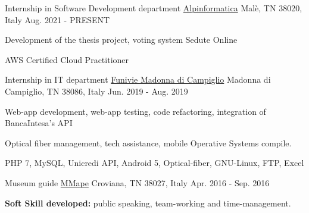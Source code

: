 

\begin{cventries}
  \cventry
    {Internship in Software Development department} %
    {\href{https://www.alpinformatica.com/}{Alpinformatica}} %
    {Malè, TN 38020, Italy} %
    {Aug. 2021 - PRESENT} %
    {
      \begin{cvitems} %
        \item {Development of the thesis project, voting system Sedute Online}
        \item {AWS Certified Cloud Practitioner}
      \end{cvitems}
      }
  \cventry
    {Internship in IT department} %
    {\href{https://www.funiviecampiglio.it}{Funivie Madonna di Campiglio}} %
    {Madonna di Campiglio, TN 38086, Italy} %
    {Jun. 2019 - Aug. 2019} %
    {
      \begin{cvitems} %
        \item {Web-app development, web-app testing, code refactoring, integration of BancaIntesa's API}
        \item {Optical fiber management, tech assistance, mobile Operative Systems compile.}
        \item {PHP 7, MySQL, Unicredi API, Android 5, Optical-fiber, GNU-Linux, FTP, Excel}
      \end{cvitems}
      }
    

  \cventry
    {Museum guide} %
    {\href{https://www.mmape.it}{MMape}} %
    {Croviana, TN 38027, Italy} %
    {Apr. 2016 - Sep. 2016} %
    {
      \begin{cvitems} %
        \item {\textbf{Soft Skill developed:} public speaking, team-working and time-management.}
      \end{cvitems}
    }


\end{cventries}
